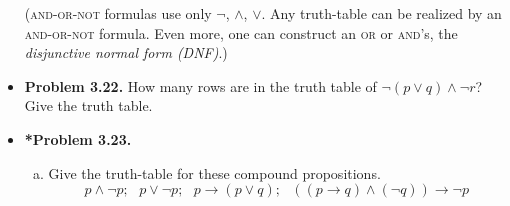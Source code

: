 \documentclass[11pt]{article}
\def\OR{\vee}
\def\AND{\wedge}
\def\imp{\rightarrow}
\begin{document}
\begin{itemize}
  (\textsc{and-or-not} formulas use only $\neg$, $\AND$, $\OR$.
   Any truth-table can be realized by an \textsc{and-or-not} formula.
   Even more, one can construct an \textsc{or} or \textsc{and}'s,
   the \textit{disjunctive normal form (DNF)}.)

\vspace{0.1in}

\item \textbf{Problem 3.22.}
  How many rows are in the truth table of $\neg(p\OR q)\AND\neg r$?
  Give the truth table.

\vspace{0.1in}

\item \textbf{*Problem 3.23.}
  \begin{enumerate}[(a)]
  \item Give the truth-table for these compound propositions.
    $$p\AND\neg p;\ \ \ p\OR\neg p;\ \ \ p\imp(p\OR q);\ \ \ ((p\imp q)\AND(\neg q))\imp\neg p$$
\begin{multicols}{4}


\end{multicols}
\end{enumerate}
\end{itemize}
\end{document}
